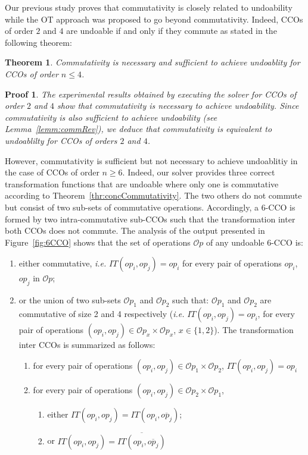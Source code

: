 \documentclass[submission,copyright,creativecommons]{eptcs}
\newtheorem*{proof*}{Proof}\newtheorem{theorem}{Theorem}
\begin{document}
Our previous study proves that commutativity is closely related to undoability while the OT approach was proposed to go beyond commutativity.  
Indeed, CCOs of order $2$ and $4$ are undoable if and only if  they commute as stated in the following theorem: 
 \begin{theorem}\label{thr:Th2-4} 
Commutativity is necessary and sufficient to achieve undoablity for CCOs of order $n\leq 4$.
\end{theorem} 
\begin{proof*}
The experimental results obtained by executing the solver for CCOs of order $2$ and $4$ show   that commutativity is necessary to achieve undoability. Since commutativity is also sufficient to achieve undoability (see Lemma~\ref{lemm:commRev}), we deduce that commutativity is equivalent to undoablilty for CCOs of orders $2$ and $4$.
\end{proof*}

However,  commutativity is sufficient but not necessary to achieve undoablitiy in the case of CCOs of order $n\geq 6$.
Indeed, our solver provides three correct transformation functions that are undoable where only  one is commutative according to Theorem~\ref{thr:concCommutativity}. The two others do not commute but consist of two sub-sets of commutative operations. Accordingly,  a $6$-CCO is formed by two  intra-commutative sub-CCOs  such that   the transformation inter both CCOs does not commute. 
The analysis of the output presented in Figure~\ref{fig:6CCO} shows that the set of operations $\mathcal{O}p$ of any undoable 6-CCO is:
\begin{enumerate}
\item either commutative, \textit{i.e.} $IT(op_i, op_j)= op_i$ for every  pair of operations $op_i$, $op_j$ in $\mathcal{O}p$; 
\item   or the union of two sub-sets $\mathcal{O}p_1$ and $\mathcal{O}p_2$ such that:
$\mathcal{O}p_1$ and $\mathcal{O}p_2$ are commutative of size 2 and 4 respectively (\textit{i.e.}  
$IT(op_i, op_j)=op_i$, for every pair of operations $(op_i, op_j) \in \mathcal{O}p_{x}\times \mathcal{O}p_{x}$, $x\in\{1,2\}$). The transformation inter CCOs is summarized as follows: \begin{enumerate}
\item for every pair of operations $(op_i, op_j) \in \mathcal{O}p_{1}\times \mathcal{O}p_{2}$, $IT(op_i,op_j)=op_i$
\item for every pair of operations $(op_i, op_j) \in \mathcal{O}p_{2}\times \mathcal{O}p_{1}$,
\begin{enumerate}
\item  either $IT(op_i, op_j)=IT(op_i, \overline{op_j})$;
\item or $IT(op_i, op_j)=\overline{IT(op_i, \overline{op_j})}$
\end{enumerate}
\end{enumerate}
\end{enumerate}
\end{document}
